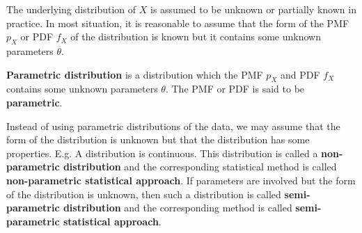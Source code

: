 \documentclass{huhtakm-template-book-v2}
\begin{document}
The underlying distribution of $X$ is assumed to be unknown or partially known in practice. In most situation, it is reasonable to assume that the form of the PMF $p_{X}$ or PDF $f_{X}$ of the distribution is known but it contains some unknown parameters $\theta$.
\begin{defn}
	\textbf{Parametric distribution} is a distribution which the PMF $p_{X}$ and PDF $f_{X}$ contains some unknown parameters $\theta$. The PMF or PDF is said to be \textbf{parametric}.
\end{defn}
\begin{rem}
	Instead of using parametric distributions of the data, we may assume that the form of the distribution is unknown but that the distribution has some properties. E.g. A distribution is continuous. This distribution is called a \textbf{non-parametric distribution} and the corresponding statistical method is called \textbf{non-parametric statistical approach}. If parameters are involved but the form of the distribution is unknown, then such a distribution is called \textbf{semi-parametric distribution} and the corresponding method is called \textbf{semi-parametric statistical approach}.
\end{rem}
\end{document}
